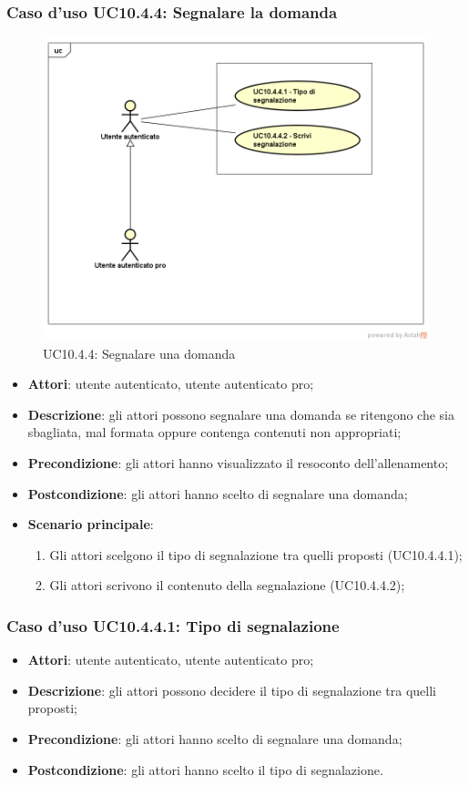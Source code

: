 \subsubsection{Caso d'uso UC10.4.4: Segnalare la domanda}
\label{UC10.4.4}
\begin{figure}
	\centering
	\includegraphics[scale=0.5]{UML/UC10_4_4.png}
	\caption{UC10.4.4: Segnalare una domanda}
\end{figure}
\FloatBarrier
	\begin{itemize}
		\item \textbf{Attori}: utente autenticato, utente autenticato pro;
		\item \textbf{Descrizione}: gli attori possono segnalare una domanda se ritengono che sia sbagliata, mal formata oppure contenga contenuti non appropriati;
		\item \textbf{Precondizione}: gli attori hanno visualizzato il resoconto dell'allenamento;
		\item \textbf{Postcondizione}: gli attori hanno scelto di segnalare una domanda;
				\item \textbf{Scenario principale}:
				\begin{enumerate}
					\item Gli attori scelgono il tipo di segnalazione tra quelli proposti (UC10.4.4.1);
					\item Gli attori scrivono il contenuto della segnalazione (UC10.4.4.2);
				\end{enumerate}
	\end{itemize}
\subsubsection{Caso d'uso UC10.4.4.1: Tipo di segnalazione}
	\begin{itemize}
		\item \textbf{Attori}: utente autenticato, utente autenticato pro;
		\item \textbf{Descrizione}: gli attori possono decidere il tipo di segnalazione tra quelli proposti;
		\item \textbf{Precondizione}: gli attori hanno scelto di segnalare una domanda;
		\item \textbf{Postcondizione}: gli attori hanno scelto il tipo di segnalazione.
	\end{itemize}
